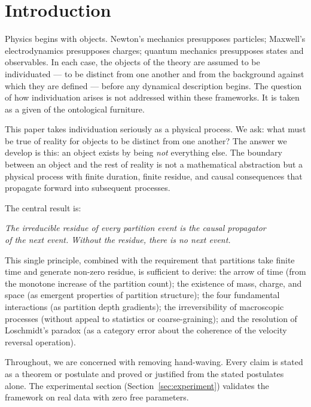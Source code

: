 \documentclass[11pt,twocolumn,a4paper]{article}
\theoremstyle{plain}
\theoremstyle{definition}
\theoremstyle{remark}
\begin{document}
\tableofcontents
\newpage

\section*{Introduction}
\label{sec:intro}

Physics begins with objects. Newton's mechanics presupposes particles; Maxwell's
electrodynamics presupposes charges; quantum mechanics presupposes states and
observables. In each case, the objects of the theory are assumed to be
individuated --- to be distinct from one another and from the background against
which they are defined --- before any dynamical description begins. The question
of how individuation arises is not addressed within these frameworks. It is
taken as a given of the ontological furniture.

This paper takes individuation seriously as a physical process. We ask: what
must be true of reality for objects to be distinct from one another? The answer
we develop is this: an object exists by being \emph{not} everything else. The
boundary between an object and the rest of reality is not a mathematical
abstraction but a physical process with finite duration, finite residue, and
causal consequences that propagate forward into subsequent processes.

The central result is:

\begin{center}
\textit{The irreducible residue of every partition event is the causal propagator\\
of the next event. Without the residue, there is no next event.}
\end{center}

This single principle, combined with the requirement that partitions take finite
time and generate non-zero residue, is sufficient to derive: the arrow of time
(from the monotone increase of the partition count); the existence of mass, charge,
and space (as emergent properties of partition structure); the four fundamental
interactions (as partition depth gradients); the irreversibility of macroscopic
processes (without appeal to statistics or coarse-graining); and the resolution
of Loschmidt's paradox (as a category error about the coherence of the velocity
reversal operation).

Throughout, we are concerned with removing hand-waving. Every claim is stated as
a theorem or postulate and proved or justified from the stated postulates alone.
The experimental section (Section~\ref{sec:experiment}) validates the framework
on real data with zero free parameters.
\end{document}
